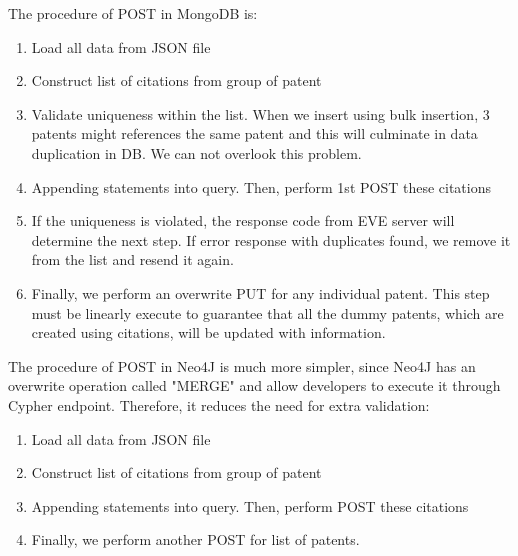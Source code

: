 \documentclass{sig-alternate}
\begin{document}
{The procedure of POST in MongoDB is:
\begin{enumerate}
 \item Load all data from JSON file
 \item Construct list of citations from group of patent
 \item Validate uniqueness within the list. When we insert using bulk insertion, 3 patents might references the same patent and this will culminate in data duplication in DB. We can not overlook this problem.
 \item Appending statements into query. Then, perform 1st POST these citations 
 \item If the uniqueness is violated, the response code from EVE server will determine the next step. If error response with duplicates found, we remove it from the list and resend it again.
 \item Finally, we perform an overwrite PUT for any individual patent. This step must be linearly execute to guarantee that all the dummy patents, which are created using citations, will be updated with information.
\end{enumerate}

The procedure of POST in Neo4J is much more simpler, since Neo4J has an overwrite operation called "MERGE" and allow developers to execute it through Cypher endpoint. Therefore, it reduces the need for extra validation:
\begin{enumerate}
 \item Load all data from JSON file
 \item Construct list of citations from group of patent
 \item Appending statements into query. Then, perform POST these citations 
 \item Finally, we perform another POST for list of patents.
\end{enumerate}

}
\end{document}
